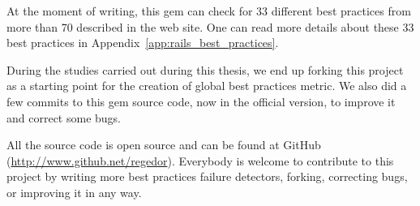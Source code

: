 At the moment of writing, this gem can check for 33 different best practices from more than 70 described in the web site.
One can read more details about these 33 best practices in Appendix~\ref{app:rails_best_practices}.

During the studies carried out during this thesis, 
we end up forking this project as a starting point for the creation of global best practices metric.
We also did a few commits to this gem source code, now in the official version, to improve it and correct some bugs. 

All the source code is open source and can be found at GitHub (\url{http://www.github.net/regedor}).
Everybody is welcome to contribute to this project by writing more best practices failure detectors,
forking, correcting bugs, or improving it in any way.



